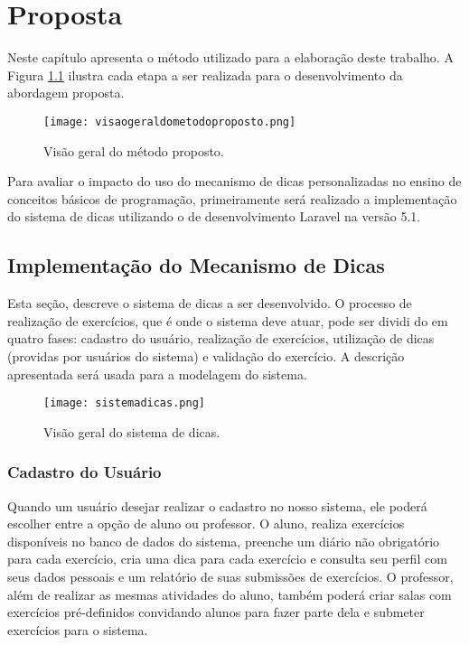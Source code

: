 \chapter{Proposta}

Neste capítulo apresenta o método utilizado para a elaboração deste trabalho. A Figura \ref{figura:visaometodo} ilustra cada etapa a ser realizada para o desenvolvimento da abordagem proposta.

\begin{figure}[h]
	\captionsetup{justification=centering}
	\texttt{[image: visaogeraldometodoproposto.png]}
	\caption{Visão geral do método proposto.}
	\label{figura:visaometodo}
\end{figure}

Para avaliar o impacto do uso do mecanismo de dicas personalizadas no ensino de conceitos básicos de programação, primeiramente será realizado a implementação do sistema de dicas utilizando o  de desenvolvimento Laravel na versão 5.1. 

\section{Implementação do Mecanismo de Dicas}

Esta seção, descreve o sistema de dicas a ser desenvolvido. O processo de realização de exercícios, que é onde o sistema deve atuar, pode ser dividi do em quatro fases: cadastro do usuário, realização de exercícios, utilização de dicas (providas por usuários do sistema) e validação do exercício. A descrição apresentada será usada para a modelagem do sistema.

\begin{figure}[h]
	\captionsetup{justification=centering}
	\texttt{[image: sistemadicas.png]}
	\caption{Visão geral do sistema de dicas.}
	\label{figura:sistemadicas}
\end{figure}

\subsection{Cadastro do Usuário}

Quando um usuário desejar realizar o cadastro no nosso sistema, ele poderá escolher entre a opção de aluno ou professor. O aluno, realiza exercícios disponíveis no banco de dados do sistema, preenche um diário não obrigatório para cada exercício, cria uma dica para cada exercício e consulta seu perfil com seus dados pessoais e um relatório de suas submissões de exercícios. O professor, além de realizar as mesmas atividades do aluno, também poderá criar salas com exercícios pré-definidos convidando alunos para fazer parte dela e submeter exercícios para o sistema.


